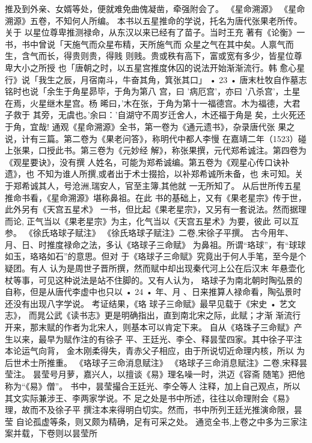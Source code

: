 推及到外亲、女婿等处，便就难免曲傀凝凿，牵强附会了。
《星命溯源》
《星命溯源》五卷，不知何人所编。
本书以五星推命的学说，托名为唐代张果老所传。关于
以星位尊卑推测禄命，从东汉以来已经有了苗子。当时王充
著有《论衡》一书，书中曾说「天施气而众星布精，天所施气而
众星之气在其中矣。人禀气而生，含气而长，得贵则贵，得贱
则贱。贵或秩有高下，富或宽有多少，皆星位尊卑大小之所授
也「唐朝之时，以五星宫推度休囚的说法开始渐渐流行。韩
愈心星行》说「我生之辰，月宿南斗，牛奋其角，箕张其口」
• 23 •
唐末杜牧自作墓志铭时也说「余生于角星昴毕，于角为第八
宫，曰 '病厄宫'，亦曰 '八杀宫'，土星在焉，火星继木星宫。杨
晞曰，'木在张，于角为第十一福德宫。木为福德，大君子救于
其旁，无虞也。'余曰：'自湖守不周岁迁舍人，木还福于角是
矣，土火死还于角，宜哉!
通观《星命溯源》全书，第一卷为《通元遗书》，杂录唐代张
果之说，计有三篇。第二卷为《果老问答》，称明代中都人李慢
在嘉靖二年（1523）碰上张果，口授此书。第三卷为《元妙经
解》，称张果撰，元代郑希诚注。第四卷为《观星要诀》，没有撰
人姓名，可能为郑希诚编。第五卷为《观星心传口诀补遗》，也
不知为谁人所撰,或者出于术士掇拾，以补郑希诚所未备，也
未可知。关于郑希诚其人，号沧洲,瑞安人，官至主簿,其他就
一无所知了。
从后世所传五星推命书看，《星命溯源》堪称鼻祖。在此
书的基础上，又有《果老星宗》传于世，此外另有《天宫五星术》
一书，但比起《果老星宗》，又另有一套说法。然而据理而论,
正气当以《果老星宗》为主，化气当以《天宫五星术》为要，彼此
可以互参。
《徐氏珞球子赋注》
《徐氏珞球子赋注》二卷,宋徐子平撰。
古今用年、月、日、时推度禄命之法，多认《珞球子三命赋》
为鼻祖。所谓“珞球”，有“球球如玉，珞珞如石”的意思。但对
于《珞球子三命赋》究竟出于何人手笔，至今是个疑团。有人
认为是周世子晋所撰，然而赋中却出现秦代河上公在后汉末
年悬壶化杖等事，可见这种说法是站不住脚的。又有人认为，
珞球子为南北朝时陶弘景的自称，但是从唐代李虚中也只以
• 24 •
年、月 、日来推算人禄命看，陶弘景时还没有出现八字学说。
考证结果，《珞 球子三命赋》最早见载于《宋史 • 艺文志》，
而晁公武《读书志》更是明确指出，直到南北宋之际，此赋；才渐
渐流行开来，那末赋的作者为北宋人，则基本可以肯定下来。
自从《珞珠子三命赋》产生以来，最早为赋作注的有徐子
平、王廷光、李仝、释昙莹四家。其中徐子平注本论运气向背，
金木刚柔得失，青赤父子相应，由于所说切近命理内核，所以
为后世术士所推重。
《珞球子三命消息赋注》
《珞球子三命消息赋注》二卷,宋释昙莹注。
昙莹号月萝，嘉兴人，以擅谈《易》理名噪一时，洪迈《容斋
随笔》把他称为“《易》僧”。 书中，昙莹撮合王廷光、李仝等人
注释，加上自己观点，所以其文实际兼涉王、李两家学说。不
足之处是书中所述，往往以命理附会《易》理，故而不及徐子平
撰注本来得明白切实。然而，书中所列王廷光推演命限，昙莹
自论孤虚等条，则又颇为精确，足有可采之处。
通览全书,上卷之中多为三家注案并载，下卷则以昙莹所

